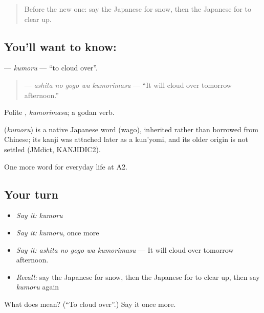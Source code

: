 \label{lesson:JA-C207-kumoru}



\begin{quote}
Before the new one: say the Japanese for snow, then the Japanese for to clear up.
\end{quote}

\subsection*{You'll want to know: }
\textbf{} — \emph{kumoru} — \textquotedblleft{}to cloud over\textquotedblright{}.

\begin{quote}
\textbf{  } — \emph{ashita no gogo wa kumorimasu} — \textquotedblleft{}It will cloud over tomorrow afternoon.\textquotedblright{}
\end{quote}

Polite \textbf{}, \emph{kumorimasu}; a godan verb.

\begin{cousinweb}
\textbf{} (\emph{kumoru}) is a native Japanese word (wago), inherited rather than borrowed from Chinese; its kanji was attached later as a kun'yomi, and its older origin is not settled (JMdict, KANJIDIC2).
\end{cousinweb}

\begin{grammarlens}[title={What you've built}]
One more word for everyday life at A2.
\end{grammarlens}

\subsection*{Your turn}
\begin{itemize}
\raggedright
  \item \emph{Say it:} \emph{kumoru}
  \item \emph{Say it:} \emph{kumoru}, once more
  \item \emph{Say it:} \emph{ashita no gogo wa kumorimasu} — It will cloud over tomorrow afternoon.
  \item \emph{Recall:} say the Japanese for snow, then the Japanese for to clear up, then say \emph{kumoru} again
\end{itemize}

\begin{tcolorbox}[breakable,colback=teal!4,colframe=teal!35!black,title={Before you move on}]
What does  mean? (\textquotedblleft{}To cloud over\textquotedblright{}.) Say it once more.
\end{tcolorbox}
